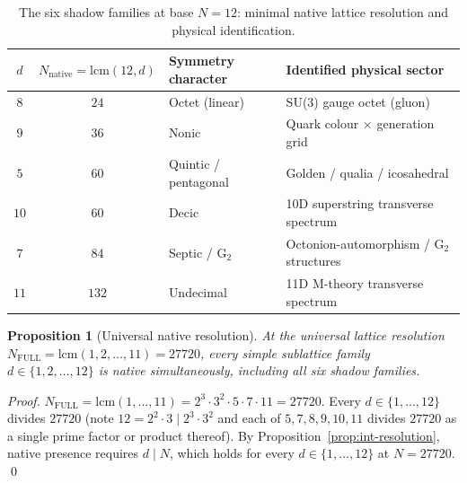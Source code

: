 \documentclass[11pt,a4paper]{article}
\newtheorem{proposition}[theorem]{Proposition}
\theoremstyle{definition}
\theoremstyle{remark}
\begin{document}
\begin{table}[ht]
\centering
\begin{tabular}{c|c|l|l}
\toprule
$d$ & $N_{\text{native}} = \mathrm{lcm}(12,d)$ & Symmetry character & Identified physical sector \\ \midrule
$8$  & $24$  & Octet (linear) & SU(3) gauge octet (gluon) \\
$9$  & $36$  & Nonic & Quark colour $\times$ generation grid \\
$5$  & $60$  & Quintic / pentagonal & Golden / qualia / icosahedral \\
$10$ & $60$  & Decic & 10D superstring transverse spectrum \\
$7$  & $84$  & Septic / G$_{2}$ & Octonion-automorphism / G$_{2}$ structures \\
$11$ & $132$ & Undecimal & 11D M-theory transverse spectrum \\ \bottomrule
\end{tabular}
\caption{The six shadow families at base $N=12$: minimal native lattice resolution and physical identification.}\label{tab:shadow-forces}
\end{table}

\begin{proposition}[Universal native resolution]\label{prop:universal-native}
At the universal lattice resolution $N_{\mathrm{FULL}} = \mathrm{lcm}(1,2,\ldots,11) = 27720$, every simple sublattice family $d \in \{1,2,\ldots,12\}$ is native simultaneously, including all six shadow families.
\end{proposition}

\begin{proof}
$N_{\mathrm{FULL}} = \mathrm{lcm}(1,\ldots,11) = 2^{3}\cdot 3^{2}\cdot 5\cdot 7\cdot 11 = 27720$. Every $d\in\{1,\ldots,12\}$ divides $27720$ (note $12 = 2^{2}\cdot 3 \mid 2^{3}\cdot 3^{2}$ and each of $5,7,8,9,10,11$ divides $27720$ as a single prime factor or product thereof). By Proposition~\ref{prop:int-resolution}, native presence requires $d\mid N$, which holds for every $d\in\{1,\ldots,12\}$ at $N=27720$. \qed
\end{proof}
\end{document}
